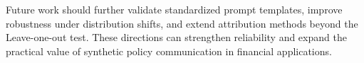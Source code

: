 %
Future work should further validate standardized prompt templates, improve robustness under distribution shifts, and extend attribution methods beyond the Leave-one-out test. These directions can strengthen reliability and expand the practical value of synthetic policy communication in financial applications.
